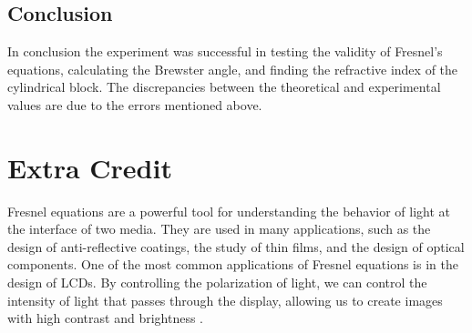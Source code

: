 \documentclass[10pt]{article}
\begin{document}
\subsection*{Conclusion} 
In conclusion the experiment was successful in testing the validity of Fresnel's equations, calculating the Brewster angle, and finding the refractive index of the cylindrical block. The discrepancies between the theoretical and experimental values are due to the errors mentioned above.
\section{Extra Credit}

Fresnel equations are a powerful tool for understanding the behavior of light at the interface of two media. They are used in many applications, such as the design of anti-reflective coatings, the study of thin films, and the design of optical components. One of the most common applications of Fresnel equations is in the design of LCDs. By controlling the polarization of light, we can control the intensity of light that passes through the display, allowing us to create images with high contrast and brightness \cite{dePooter_2002}.

\printbibliography
\end{document}

